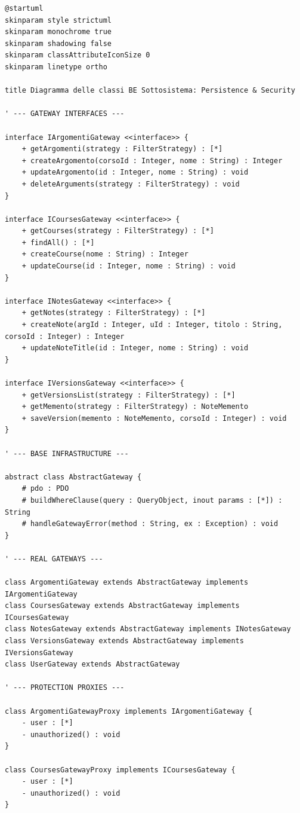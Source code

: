 \begin{verbatim}
@startuml
skinparam style strictuml
skinparam monochrome true
skinparam shadowing false
skinparam classAttributeIconSize 0
skinparam linetype ortho

title Diagramma delle classi BE Sottosistema: Persistence & Security

' --- GATEWAY INTERFACES ---

interface IArgomentiGateway <<interface>> {
    + getArgomenti(strategy : FilterStrategy) : [*]
    + createArgomento(corsoId : Integer, nome : String) : Integer
    + updateArgomento(id : Integer, nome : String) : void
    + deleteArguments(strategy : FilterStrategy) : void
}

interface ICoursesGateway <<interface>> {
    + getCourses(strategy : FilterStrategy) : [*]
    + findAll() : [*]
    + createCourse(nome : String) : Integer
    + updateCourse(id : Integer, nome : String) : void
}

interface INotesGateway <<interface>> {
    + getNotes(strategy : FilterStrategy) : [*]
    + createNote(argId : Integer, uId : Integer, titolo : String, corsoId : Integer) : Integer
    + updateNoteTitle(id : Integer, nome : String) : void
}

interface IVersionsGateway <<interface>> {
    + getVersionsList(strategy : FilterStrategy) : [*]
    + getMemento(strategy : FilterStrategy) : NoteMemento
    + saveVersion(memento : NoteMemento, corsoId : Integer) : void
}

' --- BASE INFRASTRUCTURE ---

abstract class AbstractGateway {
    # pdo : PDO
    # buildWhereClause(query : QueryObject, inout params : [*]) : String
    # handleGatewayError(method : String, ex : Exception) : void
}

' --- REAL GATEWAYS ---

class ArgomentiGateway extends AbstractGateway implements IArgomentiGateway
class CoursesGateway extends AbstractGateway implements ICoursesGateway
class NotesGateway extends AbstractGateway implements INotesGateway
class VersionsGateway extends AbstractGateway implements IVersionsGateway
class UserGateway extends AbstractGateway

' --- PROTECTION PROXIES ---

class ArgomentiGatewayProxy implements IArgomentiGateway {
    - user : [*]
    - unauthorized() : void
}

class CoursesGatewayProxy implements ICoursesGateway {
    - user : [*]
    - unauthorized() : void
}


\end{verbatim}

